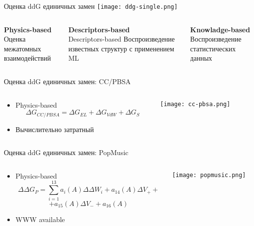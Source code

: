 \begin{frame}{Оценка ddG единичных замен}
    \centering
    \texttt{[image: ddg-single.png]}
\begin{columns}
\begin{column}{0.3\textwidth}
    \textbf{Physics-based}\\
Оценка межатомных взаимодействий
\end{column}
\begin{column}{0.3\textwidth}
    \textbf{Descriptors-based}\\
    Descriptors-based
Воспроизведение известных структур с применением ML
\end{column}
\begin{column}{0.3\textwidth}
    \textbf{Knowladge-based}\\
Воспроизведение статистических данных
\end{column}
\end{columns}
\end{frame}


\begin{frame}{Оценка ddG единичных замен: CC/PBSA}
\begin{columns}
\begin{column}{0.5\textwidth}
    \begin{itemize}
        \item Physics-based
            \[ \Delta G_{CC/PBSA} =   \Delta G_{EL} + \Delta G_{VdW} + \Delta G_{S}  \]
        \item Вычислительно затратный
    \end{itemize}
\end{column}
\begin{column}{0.5\textwidth}
    \texttt{[image: cc-pbsa.png]}
\end{column}
\end{columns}
\end{frame}


\begin{frame}{Оценка ddG единичных замен: PopMusic}
    \begin{columns}
\begin{column}{0.5\textwidth}
    \begin{itemize}
        \item Physics-based
            \[ \Delta \Delta G_{P} = \sum_{i=1}^{13} a_i(A)\Delta\Delta W_i + a_{14}(A)\Delta V_+ + \]
            \[   + a_{15}(A)\Delta V_- + a_{16}(A) \]
        \item WWW available
    \end{itemize}
\end{column}
\begin{column}{0.5\textwidth}
    \texttt{[image: popmusic.png]}
\end{column}
\end{columns}
\end{frame}

